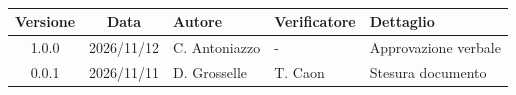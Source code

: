 \\[0.5cm]

\renewcommand{\arraystretch}{1.3}
\noindent\begin{tabularx}{\textwidth}{|c|c|>{\raggedright\arraybackslash}p{2.8cm}|>{\raggedright\arraybackslash}p{2.8cm}|X|}
    \hline
    \textbf{Versione} & \textbf{Data} & \textbf{Autore} & \textbf{Verificatore} & \textbf{Dettaglio} \\
    \hline
    1.0.0 & 2026/11/12 & C. Antoniazzo & - & Approvazione verbale \\
    \hline
    0.0.1 & 2026/11/11 & D. Grosselle & T. Caon & Stesura documento \\
    \hline
\end{tabularx}
\newpage
